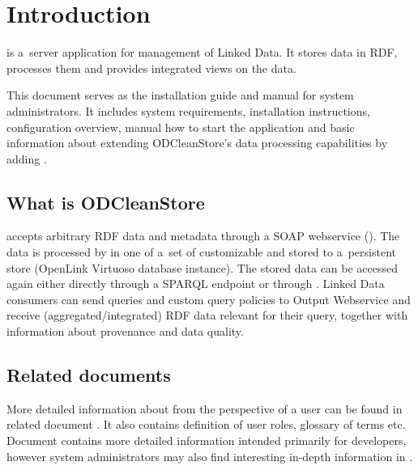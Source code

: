 
\newcommand{\version}{0.3.1}
\newcommand{\documentname}{\refadminmanual}

\hypersetup{pdftitle=ODCleanStore -- \documentname}





\renewcommand{\contentsname}{Contents}
\tableofcontents
\bigskip

\newpage


\chapter{Introduction}
\odcs is a~server application for management of Linked Data. It stores data in RDF, processes them and provides integrated views on the data.

This document serves as the installation guide and manual for system administrators. It includes system requirements, installation instructions, configuration overview, manual how to start the application and basic information about extending ODCleanStore's data processing capabilities by adding .

\section*{What is ODCleanStore}
\odcs accepts arbitrary RDF data and metadata through a SOAP webservice (). The data is processed by  in one of a~set of customizable  and stored to a~persistent store (OpenLink Virtuoso database instance). The stored data can be accessed again either  directly through a SPARQL endpoint or through . Linked Data consumers can send queries and custom query policies to Output Webservice and receive (aggregated/integrated) RDF data relevant for their query, together with information about provenance and data quality. 

\section*{Related documents}
More detailed information about \odcs from the perspective of a user can be found in related document . It also contains definition of user roles, glossary of terms etc. Document  contains more detailed information intended primarily for developers, however system administrators may also find interesting in-depth information in . 


